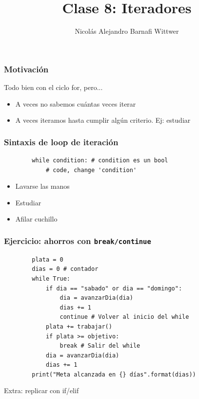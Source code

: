 \documentclass[14pt,aspectratio=169,xcolor=dvipsnames]{beamer}
\title[short title]{Clase 8: Iteradores}
\subtitle{}
\author[NA Barnafi] {Nicolás Alejandro Barnafi Wittwer}
\institute[UC|CMM] 
{
    Pontificia Universidad Católica de Chile \\
    Centro de Modelamiento Matemático
}
\begin{document}
\begin{frame}
    \maketitle
\end{frame}
\begin{frame}[fragile]\frametitle{Motivación}
    Todo bien con el ciclo for, pero...

    \begin{itemize}
        \item A veces no sabemos cuántas veces iterar
        \item A veces iteramos hasta cumplir algún criterio. Ej: estudiar
    \end{itemize}
\end{frame}
\begin{frame}[fragile]\frametitle{Sintaxis de loop de iteración}
    \begin{verbatim}
        while condition: # condition es un bool
            # code, change 'condition'
    \end{verbatim}
    
    \vspace{1cm}
    \begin{itemize}
        \item Lavarse las manos
        \item Estudiar
        \item Afilar cuchillo
    \end{itemize}
\end{frame}
\begin{frame}[fragile]\frametitle{Ejercicio: ahorros con \texttt{break/continue}}
\begin{small}
    \begin{verbatim}
        plata = 0
        dias = 0 # contador
        while True: 
            if dia == "sabado" or dia == "domingo": 
                dia = avanzarDia(dia)
                dias += 1
                continue # Volver al inicio del while
            plata += trabajar()
            if plata >= objetivo:
                break # Salir del while
            dia = avanzarDia(dia)
            dias += 1
        print("Meta alcanzada en {} días".format(dias))
    \end{verbatim}
    
 Extra: replicar con if/elif
\end{small}
\end{frame}
\end{document}
